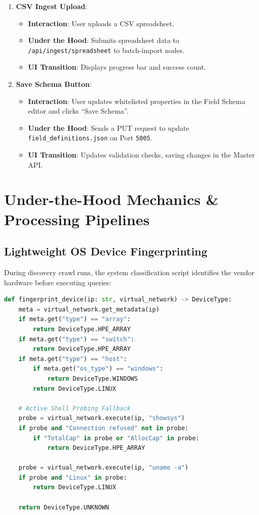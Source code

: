 \documentclass[11pt,a4paper]{article}
\begin{document}
\begin{enumerate}
    \item \textbf{CSV Ingest Upload}:
    \begin{itemize}
        \item \textbf{Interaction}: User uploads a CSV spreadsheet.
        \item \textbf{Under the Hood}: Submits spreadsheet data to \texttt{/api/ingest/spreadsheet} to batch-import nodes.
        \item \textbf{UI Transition}: Displays progress bar and success count.
    \end{itemize}
    
    \item \textbf{Save Schema Button}:
    \begin{itemize}
        \item \textbf{Interaction}: User updates whitelisted properties in the Field Schema editor and clicks ``Save Schema''.
        \item \textbf{Under the Hood}: Sends a PUT request to update \texttt{field\_definitions.json} on Port \texttt{5005}.
        \item \textbf{UI Transition}: Updates validation checks, saving changes in the Master API.
    \end{itemize}
\end{enumerate}

\newpage

\section{Under-the-Hood Mechanics \& Processing Pipelines}

\subsection{Lightweight OS Device Fingerprinting}
During discovery crawl runs, the system classification script identifies the vendor hardware before executing queries:
\begin{lstlisting}[language=Python, caption=Fingerprint Classification Pipeline]
def fingerprint_device(ip: str, virtual_network) -> DeviceType:
    meta = virtual_network.get_metadata(ip)
    if meta.get("type") == "array":
        return DeviceType.HPE_ARRAY
    if meta.get("type") == "switch":
        return DeviceType.HPE_ARRAY
    if meta.get("type") == "host":
        if meta.get("os_type") == "windows":
            return DeviceType.WINDOWS
        return DeviceType.LINUX

    # Active Shell Probing Fallback
    probe = virtual_network.execute(ip, "showsys")
    if probe and "Connection refused" not in probe:
        if "TotalCap" in probe or "AllocCap" in probe:
            return DeviceType.HPE_ARRAY
            
    probe = virtual_network.execute(ip, "uname -a")
    if probe and "Linux" in probe:
        return DeviceType.LINUX
        
    return DeviceType.UNKNOWN
\end{lstlisting}
\end{document}
